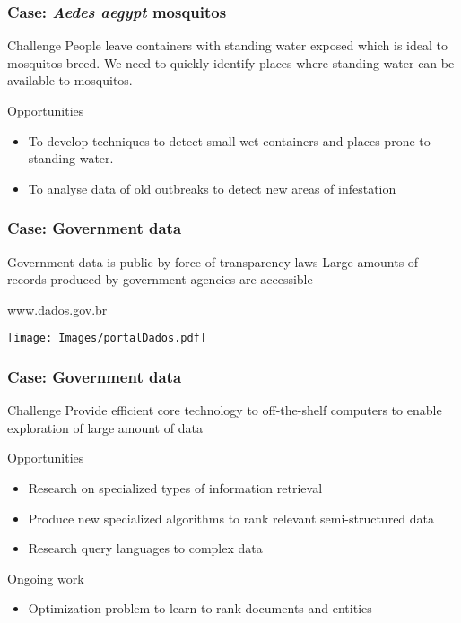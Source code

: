 \documentclass{beamer}
\begin{document}
\begin{frame}\frametitle{Case: \textit{Aedes aegypt} mosquitos}

  \begin{block}{Challenge}
People leave containers with standing water exposed which is ideal to mosquitos breed.
We need to quickly identify places where standing water can be available to mosquitos.
  \end{block}

	\begin{exampleblock}{Opportunities}
    \begin{itemize}
      \item To develop techniques to detect small wet containers and places prone to standing water. 
      \item To analyse data of old outbreaks to detect new areas of infestation
    \end{itemize}
	\end{exampleblock}
\end{frame}




\begin{frame}\frametitle{Case: Government data}

  \begin{alertblock}{Government data is public by force of transparency laws}
Large amounts of records produced by government agencies are accessible 
  \end{alertblock}

  \centering
  \href{http://www.dados.gov.br}{www.dados.gov.br}

  \texttt{[image: Images/portalDados.pdf]}

\end{frame}

\begin{frame}\frametitle{Case: Government data}
  \begin{block}{Challenge}
Provide efficient core technology to off-the-shelf computers to enable exploration of large amount of data
  \end{block}

	\begin{exampleblock}{Opportunities}
    \begin{itemize}
      \item Research on specialized types of information retrieval
      \item Produce new specialized algorithms to rank relevant semi-structured data
      \item Research query languages to complex data
    \end{itemize}
	\end{exampleblock}
  \begin{alertblock}{Ongoing work}
    \begin{itemize}
      \item Optimization problem to learn to rank documents and entities 
    \end{itemize}
  \end{alertblock}
\end{frame}
\end{document}
